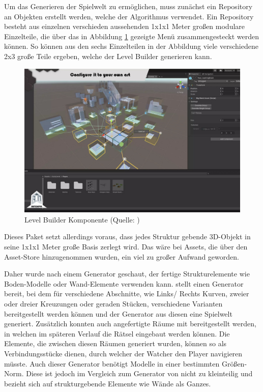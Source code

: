 Um das Generieren der Spielwelt zu ermöglichen, muss zunächst ein Repository an Objekten erstellt werden, welche der Algorithmus verwendet. Ein Repository besteht aus einzelnen verschieden aussehenden 1x1x1 Meter großen modulare Einzelteile, die über das in Abbildung \ref{fig:repository-generator} gezeigte Menü zusammengesteckt werden können. So können aus den sechs Einzelteilen in der Abbildung viele verschiedene 2x3 große Teile ergeben, welche der Level Builder generieren kann.

\begin{figure}[ht]
\centering
\includegraphics[width=1\linewidth]{content/pictures/FirstSteps02.png}
\caption{Level Builder Komponente (Quelle: \cite{alasl_autolevel_nodate})}
\label{fig:repository-generator}
\end{figure}

Dieses Paket setzt allerdings voraus, dass jedes Struktur gebende \ac{3D}-Objekt in seine 1x1x1 Meter große Basis zerlegt wird. Das wäre bei Assets, die über den Asset-Store hinzugenommen wurden, ein viel zu großer Aufwand geworden.

Daher wurde nach einem Generator geschaut, der fertige Strukturelemente wie Boden-Modelle oder Wand-Elemente verwenden kann. \cite{mysticforge_low_nodate} stellt einen Generator bereit, bei dem für verschiedene Abschnitte, wie Links/ Rechts Kurven, zweier oder dreier Kreuzungen oder geraden Stücken, verschiedene Varianten bereitgestellt werden können und der Generator aus diesen eine Spielwelt generiert. Zusätzlich konnten auch angefertigte Räume mit bereitgestellt werden, in welchen im späteren Verlauf die Rätsel eingebaut werden können. Die Elemente, die zwischen diesen Räumen generiert wurden, können so als Verbindungsstücke dienen, durch welcher der Watcher den Player navigieren müsste. Auch dieser Generator benötigt Modelle in einer bestimmten Größen-Norm. Diese ist jedoch im Vergleich zum Generator von \cite{alasl_autolevel_nodate} nicht zu kleinteilig und bezieht sich auf strukturgebende Elemente wie Wände als Ganzes.

